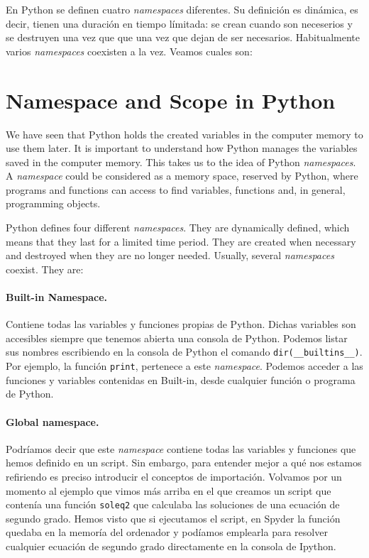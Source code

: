\begin{paracol}{2}
En Python se definen cuatro \emph{namespaces} diferentes. Su definición es dinámica, es decir, tienen una duración en tiempo límitada: se crean cuando son neceserios y se destruyen una vez que que una vez que dejan de ser necesarios. Habitualmente varios \emph{namespaces} coexisten a la vez. Veamos cuales son:

\switchcolumn
\section{Namespace and Scope in Python}
We have seen that Python holds the created variables in the computer memory to use them later. It is important to understand how Python manages the variables saved in the computer memory. This takes us to the idea of Python \emph{namespaces}.
A \emph{namespace} could be considered as a memory space, reserved by Python, where programs and functions can access to find variables, functions and, in general, programming objects.

Python defines four different \emph{namespaces}. They are dynamically defined, which means that they last for a limited time period. They are created when necessary and destroyed when they are no longer needed. Usually, several \emph{namespaces} coexist. They are:

\switchcolumn
\paragraph{Built-in Namespace.} Contiene todas las variables y funciones propias de Python. Dichas variables son accesibles siempre que tenemos abierta una consola de Python. Podemos listar sus nombres escribiendo en la consola de Python el comando \texttt{dir(__builtins__)}. Por ejemplo, la función \texttt{print}, pertenece a este \emph{namespace}. Podemos acceder a las funciones y variables contenidas en Built-in, desde cualquier función o programa de Python.

\paragraph{Global namespace.} Podríamos decir que este \emph{namespace} contiene todas las variables y funciones que hemos definido en un script. Sin embargo, para entender mejor a qué nos estamos refiriendo es preciso introducir el conceptos de importación. Volvamos por un momento al ejemplo que vimos más arriba en el que creamos un script que contenía una función \texttt{soleq2} que calculaba las soluciones de una ecuación de segundo grado. Hemos visto que si ejecutamos el script, en Spyder la función quedaba en la memoría del ordenador y podíamos emplearla para resolver cualquier ecuación de segundo grado directamente en la consola de Ipython.


\end{paracol}
